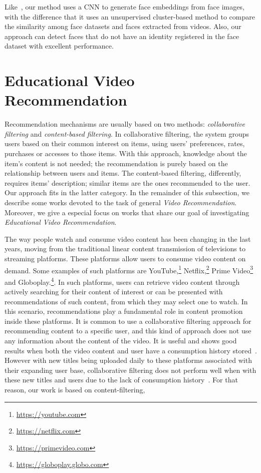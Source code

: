 Like~\cite{globofacestream, yang2017neural, rao2017attention, sohn2017unsupervised}, our method uses a CNN to generate face embeddings from face images, with the difference that it uses an unsupervised cluster-based method to compare the similarity among face datasets and faces extracted from videos. Also, our approach can detect faces that do not have an identity registered in the face dataset with excellent performance.

\section{Educational Video Recommendation}
\label{sec:recommendation}

Recommendation mechanisms are usually based on two methods: \textit{collaborative filtering} and \textit{content-based filtering}. 
In collaborative filtering, the system groups users based on their common interest on items, using users' preferences, rates, purchases or accesses to those items. With this approach, 
knowledge about the item's content is not needed; the recommendation is purely based on the relationship between users and items.  The content-based filtering, differently, requires items' description; similar items are the ones recommended to the user. Our approach fits in the latter category. In the remainder of this subsection, we describe some works devoted to the task of general \emph{Video Recommendation}. Moreover, we give a especial focus on works that share our goal of investigating \emph{Educational Video Recommendation}.

The way people watch and consume video content has been changing in the last years, moving from the traditional linear content transmission of  televisions to streaming platforms. These platforms allow users to consume video content on demand. Some examples of such platforms are YouTube,\footnote{\url{https://youtube.com}} Netflix,\footnote{\url{https://netflix.com}} Prime Video\footnote{\url{https://primevideo.com}} and Globoplay.\footnote{\url{https://globoplay.globo.com}}. In such platforms, users can retrieve video content through actively searching for their content of interest or can be presented with recommendations of such content, from which they may select one to watch. 
In this scenario, recommendations play a fundamental role in content promotion inside these platforms. It is common to use a collaborative filtering approach for recommending content to a specific user, and this kind of approach does not use any information about the content of the video. It is useful and shows good results when both the video content and user have a consumption history stored~\cite{ferreira2020investigating}. 
However with new titles being uploaded daily to these platforms associated with their expanding user base, collaborative filtering does not perform well when with these new titles and users due to the lack of consumption history~\cite{suvash14social}. For that reason, our work is based on content-filtering,

